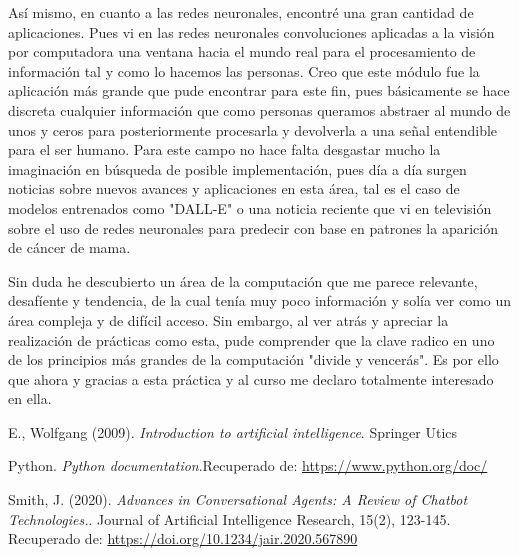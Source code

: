 \documentclass[a4paper,
               ]{jacow}
\begin{document}
Así mismo, en cuanto a las redes neuronales, encontré una gran cantidad de aplicaciones. Pues vi en las redes neuronales convoluciones aplicadas a la visión por computadora una ventana hacia el mundo real para el procesamiento de información tal y como lo hacemos las personas. Creo que este módulo fue la aplicación más grande que pude encontrar para este fin, pues básicamente se hace discreta cualquier información que como personas queramos abstraer al mundo de unos y ceros para posteriormente procesarla y devolverla a una señal entendible para el ser humano. Para este campo no hace falta desgastar mucho la imaginación en búsqueda de posible implementación, pues día a día surgen noticias sobre nuevos avances y aplicaciones en esta área, tal es el caso de modelos entrenados como "DALL-E" o una noticia reciente que vi en televisión sobre el uso de redes neuronales para predecir con base en patrones la aparición de cáncer de mama.

Sin duda he descubierto un área de la computación que me parece relevante, desafíente y tendencia, de la cual tenía muy poco información y solía ver como un área compleja y de difícil acceso. Sin embargo, al ver atrás y apreciar la realización de prácticas como esta, pude comprender que la clave radico en uno de los principios más grandes de la computación "divide y vencerás". Es por ello que ahora y gracias a esta práctica y al curso me declaro totalmente interesado en ella.

%
	{\printbibliography}%
	{%
	\begin{thebibliography}{9} %
	
		E., Wolfgang (2009). \textit{Introduction to artificial intelligence}. Springer Utics 
		
	
            Python. \textit{Python documentation}.Recuperado de:
            \url{https://www.python.org/doc/}
            
             Smith, J. (2020). \textit{Advances in Conversational Agents: A Review of Chatbot Technologies.}. Journal of Artificial Intelligence Research, 15(2), 123-145. Recuperado de: \url{https://doi.org/10.1234/jair.2020.567890}



	\end{thebibliography}
} 
\end{document}
